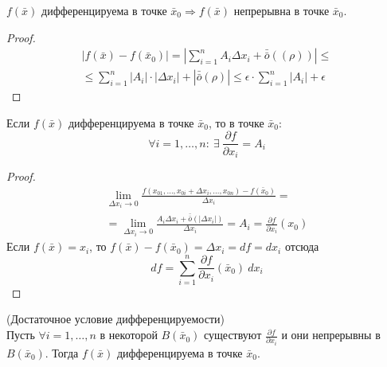 \begin{theorem}
    $f(\bar{x})$ дифференцируема в точке $\bar{x}_0 \Rightarrow f(\bar{x})$ непрерывна в точке $\bar{x}_0$.
\end{theorem} 
\begin{proof}
    \begin{multline*}
        |f(\bar{x})-f(\bar{x}_0)|=\left|\sum\limits_{i=1}^{n}A_i \Delta x_i +\bar{\bar{o}}{((\rho))}\right|\leq\\
        \leq \sum\limits_{i=1}^{n}|A_i|\cdot|\Delta x_i|+|\bar{\bar{o}}{(\rho)}|\leq \epsilon\cdot \sum\limits_{i=1}^{n}|A_i|+\epsilon
    \end{multline*}
\end{proof} 
\begin{theorem}
    Если $f(\bar{x})$ дифференцируема в точке $\bar{x}_0$, то в точке $\bar{x}_0$:
    \[\forall i=1, \dots, n:\ \exists\ \frac{\partial {f}}{\partial {x_i}}=A_i\]
\end{theorem} 
\begin{proof}
    \begin{multline*}
        \lim\limits_{\Delta x_i\to 0}\frac{f(x_{01},\dots,x_{0i}+\Delta x_i,\dots,x_{0n})-f(\bar{x}_0)}{\Delta x_i}=\\
        =\lim\limits_{\Delta x_i\to 0}\frac{A_i \Delta x_i+\bar{\bar{o}}{(|\Delta x_i|)}}{\Delta x_i}=A_i=\frac{\partial {f}}{\partial {x_i}}(x_0)
    \end{multline*}
    Если $f(\bar{x})=x_i$, то $f(\bar{x})-f(\bar{x}_0)=\Delta x_i=df=dx_i$
    отсюда
    \[df=\sum\limits_{i=1}^{n} \frac{\partial {f}}{\partial {x_i}}(\bar{x}_0)\ dx_i\]
\end{proof} 
\begin{theorem} (Достаточное условие дифференцируемости)\\
    Пусть $\forall i=1,\dots, n$ в некоторой $B(\bar{x}_0)$ существуют $\frac{\partial {f}}{\partial {x_i}}$ и они непрерывны в $B(\bar{x}_0)$. Тогда $f(\bar{x})$ дифференцируема в точке $\bar{x}_0$.
\end{theorem} 
